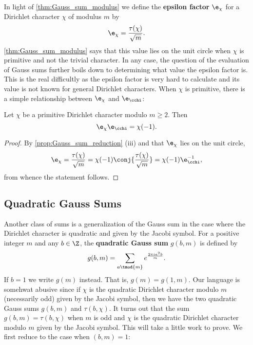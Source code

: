         In light of \cref{thm:Gauss_sum_modulus} we define the \textbf{epsilon factor} $\e_{\chi}$ for a Dirichlet character $\chi$ of modulus $m$ by
        \[
          \e_{\chi} = \frac{\tau(\chi)}{\sqrt{m}}.
        \]
        \cref{thm:Gauss_sum_modulus} says that this value lies on the unit circle when $\chi$ is primitive and not the trivial character. In any case, the question of the evaluation of Gauss sums further boils down to determining what value the epsilon factor is. This is the real difficultly as the epsilon factor is very hard to calculate and its value is not known for general Dirichlet characters. When $\chi$ is primitive, there is a simple relationship between $\e_{\chi}$ and $\e_{\cchi}$:

        \begin{proposition}\label{prop:epsilon_factor_relationship}
          Let $\chi$ be a primitive Dirichlet character modulo $m \ge 2$. Then
          \[
            \e_{\chi}\e_{\cchi} = \chi(-1).
          \]
        \end{proposition}
        \begin{proof}
          By \cref{prop:Gauss_sum_reduction} (iii) and that $\e_{\chi}$ lies on the unit circle,
          \[
            \e_{\chi} = \frac{\tau(\chi)}{\sqrt{m}} = \chi(-1)\conj{\frac{\tau(\chi)}{\sqrt{m}}} = \chi(-1)\e_{\cchi}^{-1},
          \]
          from whence the statement follows.
        \end{proof}
      \subsection*{Quadratic Gauss Sums}
        Another class of sums is a generalization of the Gauss sum in the case where the Dirichlet character is quadratic and given by the Jacobi symbol. For a positive integer $m$ and any $b \in \Z$, the \textbf{quadratic Gauss sum} $g(b,m)$ is defined by
        \[
          g(b,m) = \sum_{a \tmod{m}}e^{\frac{2\pi ia^{2}b}{m}}.
        \]
        If $b = 1$ we write $g(m)$ instead. That is, $g(m) = g(1,m)$. Our language is somehwat abusive since if $\chi$ is the quadratic Dirichlet character modulo $m$ (necessarily odd) given by the Jacobi symbol, then we have the two quadratic Gauss sums $g(b,m)$ and $\tau(b,\chi)$. It turns out that the sum $g(b,m) = \tau(b,\chi)$ when $m$ is odd and $\chi$ is the quadratic Dirichlet character modulo $m$ given by the Jacobi symbol. This will take a little work to prove. We first reduce to the case when $(b,m) = 1$:


